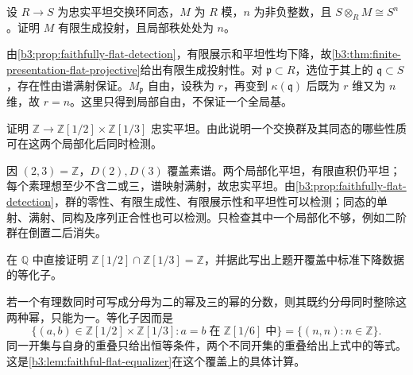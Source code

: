 \begin{exercise}\label{b3:ex:12-faithful-free-basis-bound}
	设 \(R\to S\) 为忠实平坦交换环同态，\(M\) 为 \(R\) 模，\(n\) 为非负整数，且 \(S\otimes_RM\cong S^n\)。证明 \(M\) 有限生成投射，且局部秩处处为 \(n\)。
\end{exercise}
\begin{solution}
	由\cref{b3:prop:faithfully-flat-detection}，有限展示和平坦性均下降，故\cref{b3:thm:finite-presentation-flat-projective}给出有限生成投射性。对 \(\mathfrak p\subset R\)，选位于其上的 \(\mathfrak q\subset S\)，存在性由谱满射保证。\(M_{\mathfrak p}\) 自由，设秩为 \(r\)，再变到 \(\kappa(\mathfrak q)\) 后既为 \(r\) 维又为 \(n\) 维，故 \(r=n\)。这里只得到局部自由，不保证一个全局基。
\end{solution}

\begin{exercise}\label{b3:ex:12-two-principal-cover}
	证明 \(\mathbb Z\to\mathbb Z[1/2]\times\mathbb Z[1/3]\) 忠实平坦。由此说明一个交换群及其同态的哪些性质可在这两个局部化后同时检测。
\end{exercise}
\begin{solution}
	因 \((2,3)=\mathbb Z\)，\(D(2),D(3)\) 覆盖素谱。两个局部化平坦，有限直积仍平坦；每个素理想至少不含二或三，谱映射满射，故忠实平坦。由\cref{b3:prop:faithfully-flat-detection}，群的零性、有限生成性、有限展示性和平坦性可以检测；同态的单射、满射、同构及序列正合性也可以检测。只检查其中一个局部化不够，例如二阶群在倒置二后消失。
\end{solution}

\begin{optionalexercise}\label{b3:ex:12-equalizer-integers}
	在 \(\mathbb Q\) 中直接证明 \(\mathbb Z[1/2]\cap\mathbb Z[1/3]=\mathbb Z\)，并据此写出上题开覆盖中标准下降数据的等化子。
\end{optionalexercise}
\begin{solution}
	若一个有理数同时可写成分母为二的幂及三的幂的分数，则其既约分母同时整除这两种幂，只能为一。等化子因而是
	\[
		\bigl\{(a,b)\in\mathbb Z[1/2]\times\mathbb Z[1/3]: a=b\;\text{在}\;\mathbb Z[1/6]\;\text{中}\bigr\} =\bigl\{(n,n):n\in\mathbb Z\bigr\}.
	\]
	同一开集与自身的重叠只给出恒等条件，两个不同开集的重叠给出上式中的等式。这是\cref{b3:lem:faithful-flat-equalizer}在这个覆盖上的具体计算。
\end{solution}

